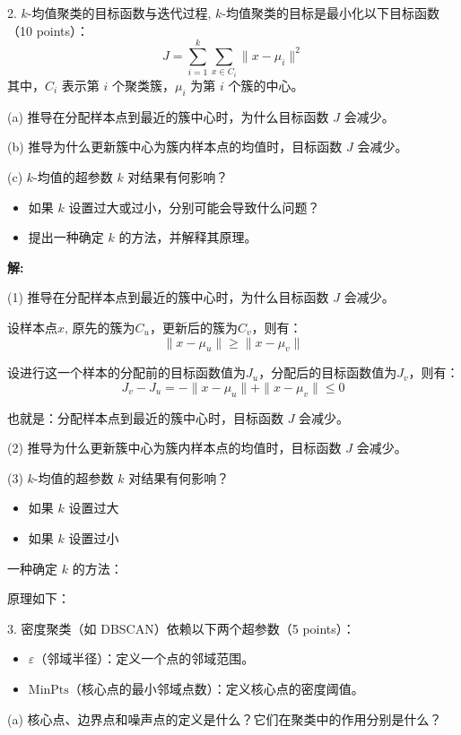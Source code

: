 \documentclass[8pt]{article}
\begin{document}
2. \( k \)-均值聚类的目标函数与迭代过程, \( k \)-均值聚类的目标是最小化以下目标函数（10 points）：  
\[
J = \sum_{i=1}^k \sum_{x \in C_i} \|x - \mu_i\|^2
\]  
其中，\( C_i \) 表示第 \( i \) 个聚类簇，\( \mu_i \) 为第 \( i \) 个簇的中心。  

(a) 推导在分配样本点到最近的簇中心时，为什么目标函数 \( J \) 会减少。 

(b) 推导为什么更新簇中心为簇内样本点的均值时，目标函数 \( J \) 会减少。 

(c) \( k \)-均值的超参数 \( k \) 对结果有何影响？  
\begin{itemize}
    \item  如果 \( k \) 设置过大或过小，分别可能会导致什么问题？  
    \item 提出一种确定 \( k \) 的方法，并解释其原理。  
\end{itemize}

\textbf{\large 解:}

(1) 推导在分配样本点到最近的簇中心时，为什么目标函数 \( J \) 会减少。

设样本点$x$, 原先的簇为$C_u$，更新后的簇为$C_v$，则有：
\[\|x-\mu_u\| \ge \|x-\mu_v\|\]

设进行这一个样本的分配前的目标函数值为$J_u$，分配后的目标函数值为$J_v$，则有：
\[J_v - J_u = - \|x-\mu_u\| + \|x-\mu_v\| \le 0 \]

也就是：分配样本点到最近的簇中心时，目标函数 \( J \) 会减少。

(2) 推导为什么更新簇中心为簇内样本点的均值时，目标函数 \( J \) 会减少。

(3) \( k \)-均值的超参数 \( k \) 对结果有何影响？ 

\begin{itemize}
    \item 如果 \( k \) 设置过大
    \item 如果 \( k \) 设置过小  
\end{itemize}

一种确定 \( k \) 的方法：

原理如下：  

\vspace{3em}

3. 密度聚类（如 DBSCAN）依赖以下两个超参数（5 points）：  
\begin{itemize}
    \item \( \varepsilon \)（邻域半径）：定义一个点的邻域范围。  
    \item \( \text{MinPts} \)（核心点的最小邻域点数）：定义核心点的密度阈值。 
\end{itemize}
(a) 核心点、边界点和噪声点的定义是什么？它们在聚类中的作用分别是什么？
\end{document}
